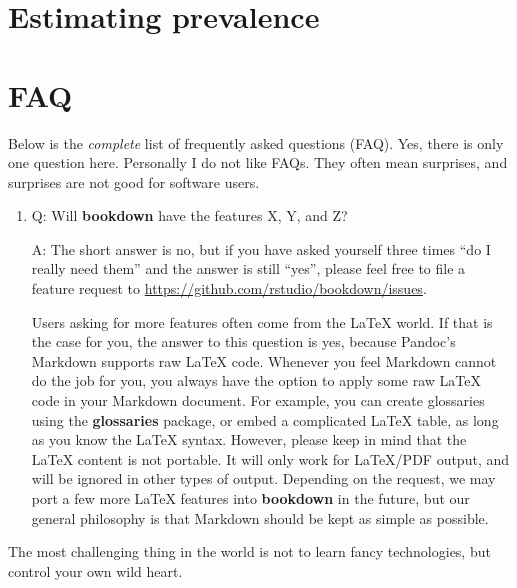 \documentclass[
  12pt,
]{krantz}
\begin{document}
\hypertarget{prevalence}{%
\chapter{Estimating prevalence}\label{prevalence}}

\hypertarget{faq}{%
\chapter*{FAQ}\label{faq}}


Below is the \emph{complete} list of frequently asked questions (FAQ). Yes, there is only one question here. Personally I do not like FAQs. They often mean surprises, and surprises are not good for software users.

\begin{enumerate}
\def\labelenumi{\arabic{enumi}.}
\item
  Q: Will \textbf{bookdown} have the features X, Y, and Z?

  A: The short answer is no, but if you have asked yourself three times ``do I really need them'' and the answer is still ``yes'', please feel free to file a feature request to \url{https://github.com/rstudio/bookdown/issues}.

  Users asking for more features often come from the LaTeX world. If that is the case for you, the answer to this question is yes, because Pandoc's Markdown supports raw LaTeX code. Whenever you feel Markdown cannot do the job for you, you always have the option to apply some raw LaTeX code in your Markdown document. For example, you can create glossaries using the \textbf{glossaries} package, or embed a complicated LaTeX table, as long as you know the LaTeX syntax. However, please keep in mind that the LaTeX content is not portable. It will only work for LaTeX/PDF output, and will be ignored in other types of output. Depending on the request, we may port a few more LaTeX features into \textbf{bookdown} in the future, but our general philosophy is that Markdown should be kept as simple as possible.
\end{enumerate}

The most challenging thing in the world is not to learn fancy technologies, but control your own wild heart.

\backmatter

  

\printindex
\end{document}
